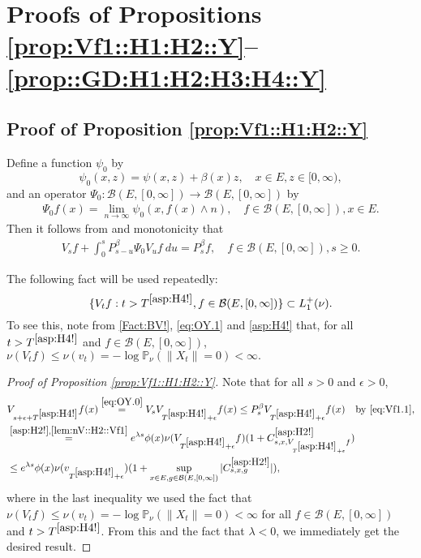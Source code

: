 \documentclass[12pt,a4paper]{amsart}
\numberwithin{equation}{section}
\theoremstyle{plain}
\theoremstyle{definition}
\theoremstyle{remark}
\begin{document}
\section{Proofs of Propositions \ref{prop:Vf1::H1:H2::Y}--\ref{prop::GD:H1:H2:H3:H4::Y}}
\subsection{Proof of Proposition \ref{prop:Vf1::H1:H2::Y}} \label{sec:Vf1}
	Define a function $\psi_0$ by
\[
	\psi_0(x,z) = \psi(x,z)+ \beta(x) z, \quad x\in E, z\in [0,\infty),
\]	
	and an operator $\Psi_0: \mathcal B(E, [0,\infty]) \to \mathcal B(E,[0,\infty])$ by
\begin{align}
	\Psi_0 f(x)
	= \lim_{n\to \infty} \psi_0(x,f(x) \wedge n),
	\quad f\in \mathcal B(E,[0,\infty]), x\in E.
\end{align}
	Then it follows from \cite[Theorem 2.23]{Li2011MeasureValued} and monotonicity that
\begin{align}\label{eq:Vf1.1}
	V_s f + \int_0^s P_{s-u}^\beta \Psi_0 V_{u} f ~du
	= P_s^\beta f,
	\quad f\in \mathcal B(E,[0,\infty]), s\geq 0.
\end{align}

	The following fact will be used repeatedly:
\begin{equation} \label{lem:nV::H2::Vf1}
	\{V_tf:t> T^{\eqref{asp:H4!}}, f\in \mathcal B(E, [0,\infty])\}\subset L_1^+(\nu).
\end{equation}
	To see this, note from \eqref{Fact:BV!}, \eqref{eq:OY.1} and \eqref{asp:H4!} that, for  all $t> T^{\eqref{asp:H4!}}$ and $f\in \mathcal B(E,[0,\infty])$, $\nu(V_t f) \leq \nu(v_t)   = - \log \mathbb P_\nu (\|X_t\| = 0)  < \infty. $

\begin{proof}[{Proof of Proposition \ref{prop:Vf1::H1:H2::Y}}]
	Note that for all $s>0$ and $\epsilon>0$,
\begin{align}
	& V_{s+\epsilon +T^{\eqref{asp:H4!}}} f (x)
	\overset{\eqref{eq:OY.0}}= V_s V_{T^{\eqref{asp:H4!}}+\epsilon} f(x)
	\leq P_s^\beta V_{T^{\eqref{asp:H4!}} + \epsilon} f(x)\quad\text{by \eqref{eq:Vf1.1}},
 	\\ \label{eq:Vf1.2} & \overset{\eqref{asp:H2!},\eqref{lem:nV::H2::Vf1}}= e^{\lambda s}\phi(x) \nu( V_{T^{\eqref{asp:H4!}} +\epsilon} f)  (1+ C^{\eqref{asp:H2!}}_{s,x,V_{T^{\eqref{asp:H4!}} + \epsilon} f})
	\\&\leq e^{\lambda s}\phi(x) \nu(v_{T^{\eqref{asp:H4!}} +\epsilon})  (1+ \sup_{x\in E, g\in \mathcal B(E,[0,\infty])}|C^{\eqref{asp:H2!}}_{s,x,g}|),
\end{align}
	where
	in the last inequality we used the fact that $\nu(V_t f) \leq \nu(v_t)   = - \log \mathbb P_\nu (\|X_t\| = 0)  < \infty$  %
	for all  $f\in \mathcal B(E,[0,\infty])$ and $t > T^{\eqref{asp:H4!}}$.
	From this and the fact that $\lambda < 0$, we immediately get the desired result.
\end{proof}
\end{document}
